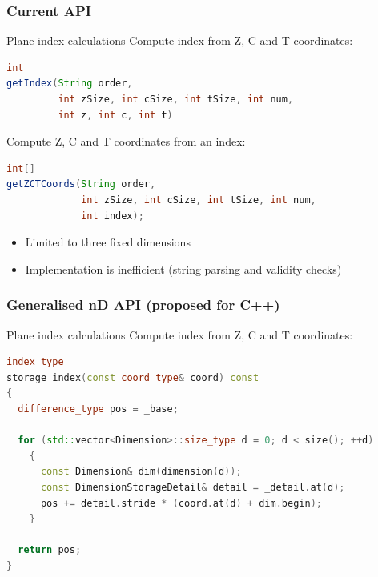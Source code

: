 \documentclass{beamer}
\begin{document}
\begin{frame}[fragile]
  \frametitle{Current API}
  \begin{block}{Plane index calculations}
    Compute index from Z, C and T coordinates:
  \begin{lstlisting}[language=Java]
int
getIndex(String order,
         int zSize, int cSize, int tSize, int num,
         int z, int c, int t)
  \end{lstlisting}
  Compute Z, C and T coordinates from an index:
  \begin{lstlisting}[language=Java]
int[]
getZCTCoords(String order,
             int zSize, int cSize, int tSize, int num,
             int index);
  \end{lstlisting}
  \begin{itemize}
  \item Limited to three fixed dimensions
  \item Implementation is inefficient (string parsing and validity checks)
  \end{itemize}
  \end{block}
\end{frame}

\begin{frame}[fragile]
  \frametitle{Generalised nD API (proposed for C++)}
  \begin{block}{Plane index calculations}
    Compute index from Z, C and T coordinates:
  \begin{lstlisting}[language=C++]
index_type
storage_index(const coord_type& coord) const
{
  difference_type pos = _base;

  for (std::vector<Dimension>::size_type d = 0; d < size(); ++d)
    {
      const Dimension& dim(dimension(d));
      const DimensionStorageDetail& detail = _detail.at(d);
      pos += detail.stride * (coord.at(d) + dim.begin);
    }

  return pos;
}
  \end{lstlisting}
  \end{block}
\end{frame}
\end{document}
